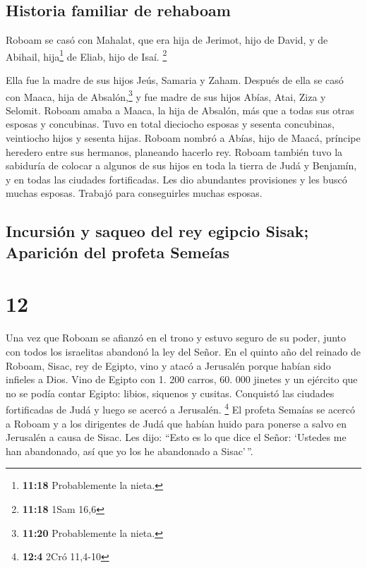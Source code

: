 \hypertarget{historia-familiar-de-rehaboam}{%
\subsection{Historia familiar de
rehaboam}\label{historia-familiar-de-rehaboam}}

 Roboam se casó con Mahalat, que era hija de Jerimot,
hijo de David, y de Abihail, hija\footnote{\textbf{11:18} Probablemente
  la nieta.} de Eliab, hijo de Isaí. \footnote{\textbf{11:18} 1Sam 16,6}

 Ella fue la madre de sus hijos Jeús, Samaria y Zaham.
 Después de ella se casó con Maaca, hija de
Absalón,\footnote{\textbf{11:20} Probablemente la nieta.} y fue madre de
sus hijos Abías, Atai, Ziza y Selomit.  Roboam amaba a
Maaca, la hija de Absalón, más que a todas sus otras esposas y
concubinas. Tuvo en total dieciocho esposas y sesenta concubinas,
veintiocho hijos y sesenta hijas.  Roboam nombró a Abías,
hijo de Maacá, príncipe heredero entre sus hermanos, planeando hacerlo
rey.  Roboam también tuvo la sabiduría de colocar a
algunos de sus hijos en toda la tierra de Judá y Benjamín, y en todas
las ciudades fortificadas. Les dio abundantes provisiones y les buscó
muchas esposas. Trabajó para conseguirles muchas esposas.

\hypertarget{incursiuxf3n-y-saqueo-del-rey-egipcio-sisak-apariciuxf3n-del-profeta-semeuxedas}{%
\subsection{Incursión y saqueo del rey egipcio Sisak; Aparición del
profeta
Semeías}\label{incursiuxf3n-y-saqueo-del-rey-egipcio-sisak-apariciuxf3n-del-profeta-semeuxedas}}

\hypertarget{section-11}{%
\section{12}\label{section-11}}

 Una vez que Roboam se afianzó en el trono y estuvo seguro
de su poder, junto con todos los israelitas abandonó la ley del Señor.
 En el quinto año del reinado de Roboam, Sisac, rey de
Egipto, vino y atacó a Jerusalén porque habían sido infieles a Dios.
 Vino de Egipto con 1. 200 carros, 60. 000 jinetes y un
ejército que no se podía contar Egipto: libios, siquenos y cusitas.
 Conquistó las ciudades fortificadas de Judá y luego se
acercó a Jerusalén. \footnote{\textbf{12:4} 2Cró 11,4-10} 
El profeta Semaías se acercó a Roboam y a los dirigentes de Judá que
habían huido para ponerse a salvo en Jerusalén a causa de Sisac. Les
dijo: ``Esto es lo que dice el Señor: `Ustedes me han abandonado, así
que yo los he abandonado a Sisac'\,''.

